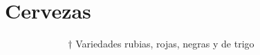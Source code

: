 \section{Cervezas}


$ \>  \>  \>  \>  \>  \>  \>  \>  \>  \>  \>  \>  \>  \>  \>  \>  \>  \>  \>  \>  \>  \>  \>  \>  \>  \>  \>  \>  $ $\dag$ 
Variedades rubias, rojas, negras y de trigo



